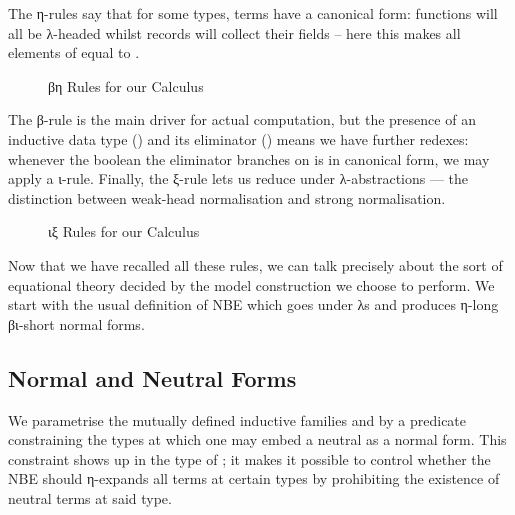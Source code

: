 The η-rules say that for some types, terms have a canonical form: functions will all
be λ-headed whilst records will collect their fields -- here this makes all elements
of \AIC{\unit{}} equal to .

\begin{figure}[h]
\caption{βη Rules for our Calculus\label{fig:betaetarules}}
\end{figure}

The β-rule is the main driver for actual computation,
but the presence of an inductive data type () and its eliminator
() means we have further redexes: whenever the
boolean the eliminator branches on is in canonical form, we may apply
a ι-rule. Finally, the ξ-rule lets us reduce under
λ-abstractions --- the distinction between weak-head normalisation and
strong normalisation.

\begin{figure}[h]
\caption{ιξ Rules for our Calculus\label{fig:iotaxirules}}
\end{figure}

Now that we have recalled all these rules, we can talk precisely about the
sort of equational theory decided by the model construction we choose to
perform. We start with the usual definition of NBE
which goes under λs and produces η-long βι-short normal forms.

\subsection{Normal and Neutral Forms}

We parametrise the mutually defined inductive families  and 
by a predicate  constraining the types at which one may embed a neutral
as a normal form. This constraint shows up in the type of ; it makes
it possible to control whether the NBE should η-expands all terms at certain
types by prohibiting the existence of neutral terms at said type.

